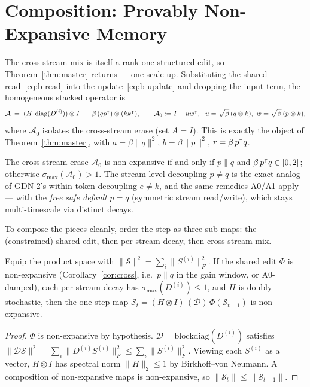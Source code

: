 \documentclass[11pt,letterpaper,logo]{yalearxiv}
\newcommand{\smax}{\sigma_{\max}}
\newcommand{\Sbb}{\boldsymbol{\mathcal{S}}}    %
\newcommand{\Acal}{\mathcal{A}}                %
\begin{document}
\section{Composition: Provably Non-Expansive Memory}
\label{sec:compose}

The cross-stream mix is itself a rank-one-structured edit, so Theorem~\ref{thm:master}
returns --- one scale up. Substituting the shared read~\eqref{eq:b-read} into the
update~\eqref{eq:b-update} and dropping the input term, the homogeneous stacked operator is
\begin{equation}
  \Acal \;=\; (H\!\cdot\!\diag(D^{(i)})) \otimes I \;-\; \beta\,(q p^{\tr}) \otimes (k k^{\tr}),
  \qquad
  \Acal_0 := I - u w^{\tr},\ \ u = \sqrt{\beta}\,(q \otimes k),\ w = \sqrt{\beta}\,(p \otimes k),
  \label{eq:cross}
\end{equation}
where $\Acal_0$ isolates the cross-stream erase (set $A=I$). This is exactly the object of
Theorem~\ref{thm:master}, with $a = \beta\|q\|^2$, $b = \beta\|p\|^2$, $r = \beta\,p^{\intercal}q$.

\begin{corollary}
\label{cor:cross}
The cross-stream erase $\Acal_0$ is non-expansive if and only if $p \parallel q$ and
$\beta\,p^{\intercal}q \in [0,2]$; otherwise $\smax(\Acal_0) > 1$. The stream-level decoupling
$p \neq q$ is the exact analog of GDN-2's within-token decoupling $e \neq k$, and the same
remedies A0/A1 apply --- with the \emph{free safe default} $p = q$ (symmetric stream
read/write), which stays multi-timescale via distinct decays.
\end{corollary}

To compose the pieces cleanly, order the step as three sub-maps: the (constrained) shared
edit, then per-stream decay, then cross-stream mix.

\begin{proposition}
\label{prop:compose}
Equip the product space with $\|\Sbb\|^2 = \sum_i \|S^{(i)}\|_F^2$. If the shared edit
$\Phi$ is non-expansive (Corollary~\ref{cor:cross}, i.e.\ $p \parallel q$ in the gain
window, or A0-damped), each per-stream decay has $\smax(D^{(i)}) \le 1$, and $H$ is doubly
stochastic, then the one-step map $\Sbb_t = (H \otimes I)\,(\mathcal D)\,\Phi(\Sbb_{t-1})$ is
non-expansive.
\end{proposition}
\begin{proof}
$\Phi$ is non-expansive by hypothesis. $\mathcal D = \mathrm{blockdiag}(D^{(i)})$ satisfies
$\|\mathcal D \Sbb\|^2 = \sum_i \|D^{(i)} S^{(i)}\|_F^2 \le \sum_i \|S^{(i)}\|_F^2$. Viewing
each $S^{(i)}$ as a vector, $H \otimes I$ has spectral norm $\|H\|_2 \le 1$ by
Birkhoff--von Neumann. A composition of non-expansive maps is non-expansive, so
$\|\Sbb_t\| \le \|\Sbb_{t-1}\|$.
\end{proof}
\end{document}
